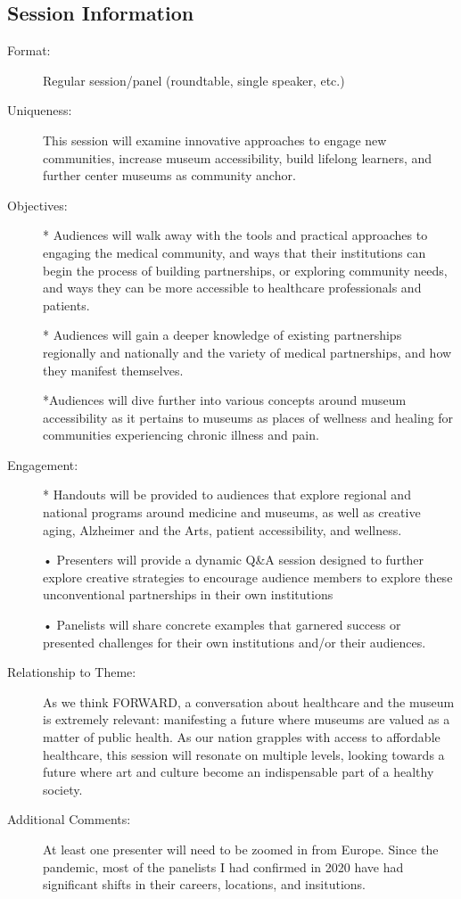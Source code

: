 \documentclass{report}
\begin{document}
              \subsection*{Session Information}
                \begin{description}
                  \item [Format:] Regular session/panel (roundtable, single speaker, etc.)
							    
							    \item [Uniqueness:]This session will examine innovative approaches to engage new communities, increase museum accessibility, build lifelong learners, and further center museums as community anchor.
							    \item [Objectives:]* Audiences will walk away with the tools and practical approaches to engaging the medical community, and ways that their institutions can begin the process of building partnerships, or exploring community needs, and ways they can be more accessible to healthcare professionals and patients.

* Audiences will gain a deeper knowledge of existing partnerships regionally and nationally and the variety of medical partnerships, and how they manifest themselves.

*Audiences will dive further into various concepts around museum accessibility as it pertains to  museums as places of wellness and  healing for communities experiencing chronic illness and pain.
							    \item [Engagement:]* Handouts will be provided to audiences that explore regional and national programs around medicine and museums, as well as creative aging, Alzheimer and the Arts, patient accessibility, and wellness. 

• Presenters will provide a dynamic Q\&A session designed to further explore creative strategies to encourage audience members to explore these unconventional partnerships in their own institutions

• Panelists will share concrete examples that garnered success or presented challenges for their own institutions and/or their audiences.
							    \item [Relationship to Theme:]As we think FORWARD, a conversation about healthcare and the museum is extremely relevant: manifesting a future where museums are valued as a matter of public health. As our nation grapples with access to affordable healthcare, this session will resonate on multiple levels, looking towards a future where art and culture become an indispensable part of a healthy society.
							    
                    \item [Additional Comments: ]At least one presenter will need to be zoomed in from Europe. Since the pandemic, most of the panelists I had confirmed in 2020 have had significant shifts in their careers, locations, and insitutions.

                \end{description}
\end{document}
